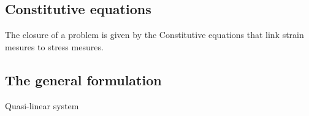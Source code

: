 \subsection{Constitutive equations}
The closure of a problem is given by the Constitutive equations that link strain mesures to stress mesures. 
\subsection{The general formulation}
Quasi-linear system




